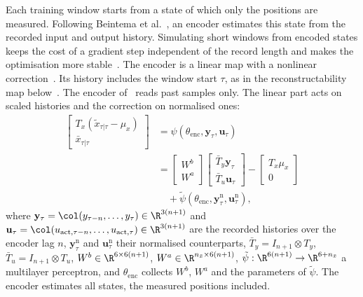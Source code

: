 Each training window starts from a state of which only the positions are
measured.
Following Beintema et al.~\cite{beintema2023subnet}, an encoder estimates this
state from the recorded input and output history.
Simulating short windows from encoded states keeps the cost of a gradient step
independent of the record length and makes the optimisation more
stable~\cite[Secs.~2, 3]{beintema2023subnet}.
The encoder is a linear map with a nonlinear
correction~\cite[Eq.~(8)]{hoekstra2026encoder}.
Its history includes the window start $\tau$, as in the reconstructability map
below~\cite[Eqs.~(11) to (17)]{hoekstra2026encoder}.
The encoder of~\cite[Eq.~(22e)]{hoekstra2026lfr} reads past samples only.
The linear part acts on scaled histories and the correction on normalised ones:
\begin{equation}
\begin{aligned}
 \begin{bmatrix}T_x(\tilde x_{\tau|\tau}-\mu_x)\\ \bar x_{\tau|\tau}\end{bmatrix}
 &=\psi(\theta_{\mathrm{enc}},\mathbf y_\tau,\mathbf u_\tau)\\
 &=\begin{bmatrix}W^b\\ W^a\end{bmatrix}
   \begin{bmatrix}\bar T_y\mathbf y_\tau\\ \bar T_u\mathbf u_\tau\end{bmatrix}
  -\begin{bmatrix}T_x\mu_x\\ 0\end{bmatrix}\\
 &\quad+\tilde\psi(\theta_{\mathrm{enc}},\mathbf y^{\mathrm n}_\tau,\mathbf u^{\mathrm n}_\tau),
\end{aligned}
\label{eq:aug_encoder}
\end{equation}
where $\mathbf y_\tau=\col(y_{\tau-n},\dots,y_\tau)\in\R^{3(n+1)}$ and
$\mathbf u_\tau=\col(u_{\mathrm{act},\tau-n},\dots,u_{\mathrm{act},\tau})\in\R^{3(n+1)}$
are the recorded histories over the encoder lag $n$,
$\mathbf y^{\mathrm n}_\tau$ and $\mathbf u^{\mathrm n}_\tau$ their normalised
counterparts, $\bar T_y=I_{n+1}\otimes T_y$, $\bar T_u=I_{n+1}\otimes T_u$,
$W^b\in\R^{6\times6(n+1)}$, $W^a\in\R^{n_{\bar x}\times6(n+1)}$,
$\tilde\psi:\R^{6(n+1)}\to\R^{6+n_{\bar x}}$ a multilayer perceptron, and
$\theta_{\mathrm{enc}}$ collects $W^b$, $W^a$ and the parameters of
$\tilde\psi$.
The encoder estimates all states, the measured positions included.

